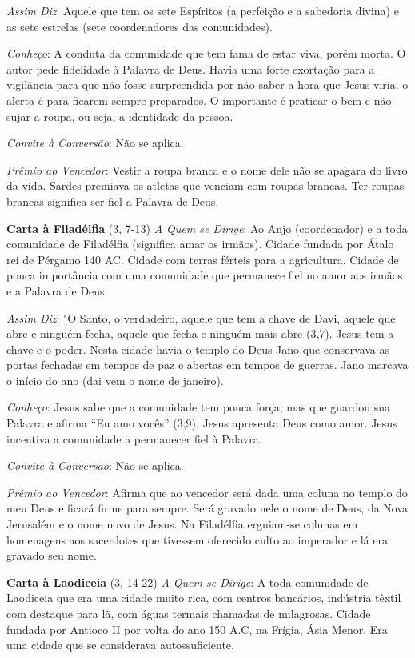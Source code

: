 \documentclass[
]{book}
\begin{document}
\emph{Assim Diz}: Aquele que tem os sete Espíritos (a perfeição e a sabedoria divina) e as sete estrelas (sete coordenadores das comunidades).

\emph{Conheço}: A conduta da comunidade que tem fama de estar viva, porém morta. O autor pede fidelidade à Palavra de Deus. Havia uma forte exortação para a vigilância para que não fosse surpreendida por não saber a hora que Jesus viria. o alerta é para ficarem sempre preparados. O importante é praticar o bem e não sujar a roupa, ou seja, a identidade da pessoa.

\emph{Convite à Conversão}: Não se aplica.

\emph{Prêmio ao Vencedor}: Vestir a roupa branca e o nome dele não se apagara do livro da vida. Sardes premiava os atletas que venciam com roupas brancas. Ter roupas brancas significa ser fiel a Palavra de Deus.

\textbf{Carta à Filadélfia} (3, 7-13)
\emph{A Quem se Dirige}: Ao Anjo (coordenador) e a toda comunidade de Filadélfia (significa amar os irmãos). Cidade fundada por Átalo rei de Pérgamo 140 AC. Cidade com terras férteis para a agricultura. Cidade de pouca importância com uma comunidade que permanece fiel no amor aos irmãos e a Palavra de Deus.

\emph{Assim Diz}: "O Santo, o verdadeiro, aquele que tem a chave de Davi, aquele que abre e ninguém fecha, aquele que fecha e ninguém mais abre (3,7). Jesus tem a chave e o poder. Nesta cidade havia o templo do Deus Jano que conservava as portas fechadas em tempos de paz e abertas em tempos de guerras. Jano marcava o início do ano (dai vem o nome de janeiro).

\emph{Conheço}: Jesus sabe que a comunidade tem pouca força, mas que guardou sua Palavra e afirma ``Eu amo vocês'' (3,9). Jesus apresenta Deus como amor. Jesus incentiva a comunidade a permanecer fiel à Palavra.

\emph{Convite à Conversão}: Não se aplica.

\emph{Prêmio ao Vencedor}: Afirma que ao vencedor será dada uma coluna no templo do meu Deus e ficará firme para sempre. Será gravado nele o nome de Deus, da Nova Jerusalém e o nome novo de Jesus. Na Filadélfia erguiam-se colunas em homenagens aos sacerdotes que tivessem oferecido culto ao imperador e lá era gravado seu nome.

\textbf{Carta à Laodiceia} (3, 14-22)
\emph{A Quem se Dirige}: A toda comunidade de Laodiceia que era uma cidade muito rica, com centros bancários, indústria têxtil com destaque para lã, com águas termais chamadas de milagrosas. Cidade fundada por Antioco II por volta do ano 150 A.C, na Frígia, Ásia Menor. Era uma cidade que se considerava autossuficiente.
\end{document}
